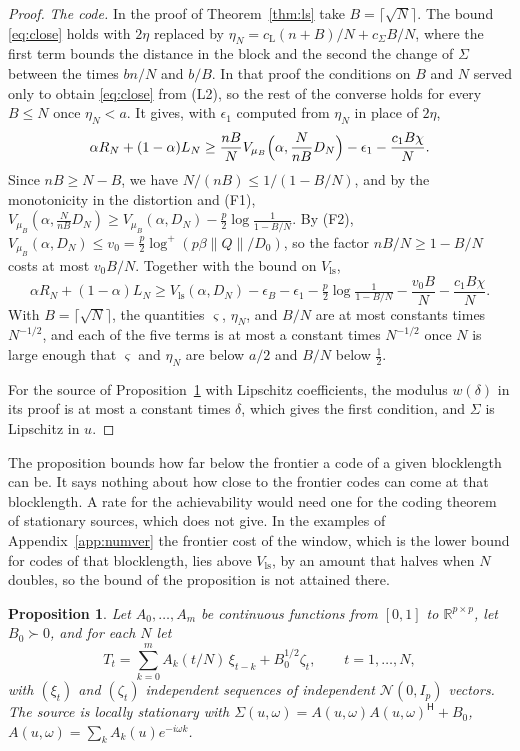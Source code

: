 \documentclass[11pt,onecolumn]{IEEEtran}
\newtheorem{proposition}[theorem]{Proposition}
\newcommand{\R}{\mathbb{R}}
\newcommand{\herm}{\mathsf H}
\newcommand{\Vls}{V_{\mathrm{ls}}}
\begin{document}
\begin{proof}
\emph{The code.} In the proof of Theorem~\ref{thm:ls} take
$B=\lceil\sqrt N\rceil$. The bound \eqref{eq:close} holds with
$2\eta$ replaced by
$\eta_N=c_{\mathrm L}(n+B)/N+c_\Sigma B/N$, where the first term bounds
the distance in the block and the second the change of $\Sigma$ between
the times $bn/N$ and $b/B$. In that proof the conditions on $B$ and
$N$ served only to obtain \eqref{eq:close} from (L2), so the rest of
the converse holds for every $B\le N$ once $\eta_N<a$. It gives, with
$\epsilon_1$ computed from $\eta_N$ in place of $2\eta$,
\[
\alpha R_N+(1-\alpha)L_N\ge\frac{nB}{N}V_{\mu_B}\Bigl(\alpha,\frac{N}{nB}D_N\Bigr)-\epsilon_1-\frac{c_1B\chi}{N}.
\]
Since $nB\ge N-B$, we have $N/(nB)\le1/(1-B/N)$, and by the
monotonicity in the distortion and (F1),
$V_{\mu_B}(\alpha,\tfrac{N}{nB}D_N)\ge V_{\mu_B}(\alpha,D_N)-\tfrac p2\log\tfrac1{1-B/N}$.
By (F2), $V_{\mu_B}(\alpha,D_N)\le v_0=\tfrac p2\log^+(p\beta\|Q\|/D_0)$,
so the factor $nB/N\ge1-B/N$ costs at most $v_0B/N$. Together with the
bound on $\Vls$,
\[
\alpha R_N+(1-\alpha)L_N\ge\Vls(\alpha,D_N)-\epsilon_B-\epsilon_1-\tfrac p2\log\tfrac1{1-B/N}-\frac{v_0B}{N}-\frac{c_1B\chi}{N}.
\]
With $B=\lceil\sqrt N\rceil$, the quantities $\varsigma$, $\eta_N$, and
$B/N$ are at most constants times $N^{-1/2}$, and each of the five
terms is at most a constant times $N^{-1/2}$ once $N$ is large enough
that $\varsigma$ and $\eta_N$ are below $a/2$ and $B/N$ below
$\tfrac12$.

For the source of Proposition~\ref{prop:tvma} with Lipschitz
coefficients, the modulus $w(\delta)$ in its proof is at most a
constant times $\delta$, which gives the first condition, and
$\Sigma$ is Lipschitz in $u$.
\end{proof}

The proposition bounds how far below the frontier a code of a given
blocklength can be. It says nothing about how close to the frontier
codes can come at that blocklength. A rate for the achievability would
need one for the coding theorem of stationary sources, which
\cite{part2} does not give. In the examples of
Appendix~\ref{app:numver} the frontier cost of the window, which is the
lower bound for codes of that blocklength, lies above $\Vls$, by an
amount that halves when $N$ doubles, so the bound of the proposition
is not attained there.

\begin{proposition}\label{prop:tvma}
Let $A_0,\dots,A_m$ be continuous functions from $[0,1]$ to
$\R^{p\times p}$, let $B_0\succ0$, and for each $N$ let
\[
T_t=\sum_{k=0}^mA_k(t/N)\,\xi_{t-k}+B_0^{1/2}\zeta_t,\qquad t=1,\dots,N,
\]
with $(\xi_t)$ and $(\zeta_t)$ independent sequences of independent
$\mathcal N(0,I_p)$ vectors. The source is locally stationary with
$\Sigma(u,\omega)=A(u,\omega)A(u,\omega)^{\herm}+B_0$,
$A(u,\omega)=\sum_kA_k(u)e^{-i\omega k}$.
\end{proposition}
\end{document}
